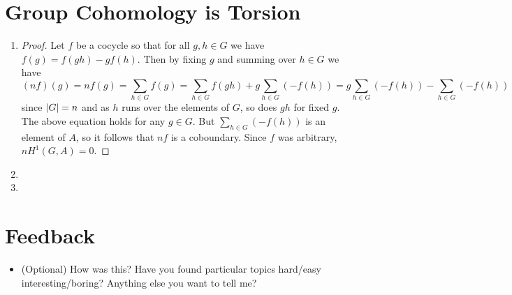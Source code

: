 \documentclass[11pt]{article}
\begin{document}
\section{Group Cohomology is Torsion}
\begin{enumerate}[label=(\alph*)]
    \item \begin{proof}
        Let $f$ be a cocycle so that for all $g,h\in G$ we have $f(g) = f(gh)-gf(h)$. Then by fixing $g$ and summing over $h\in G$ we have \[(nf)(g) = nf(g) = \sum_{h\in G} f(g) = \sum_{h\in G} f(gh)+ g\sum_{h\in G} (-f(h)) = g\sum_{h\in G} (-f(h)) - \sum_{h\in G} (-f(h))\] since $\abs{G} = n$ and as $h$ runs over the elements of $G$, so does $gh$ for fixed $g$. The above equation holds for any $g\in G$. But $\sum_{h\in G} (-f(h))$ is an element of $A$, so it follows that $nf$ is a coboundary. Since $f$ was arbitrary, $nH^1(G,A) = 0$.
    \end{proof}
    \item 
    \item 
\end{enumerate}
\section{Feedback}
\begin{itemize}
    \item (Optional) How was this? Have you found particular topics hard/easy interesting/boring?
    Anything else you want to tell me?
\end{itemize}
\end{document}
